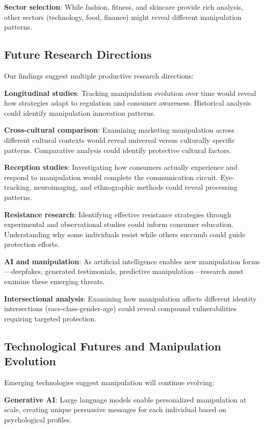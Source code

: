 \textbf{Sector selection}: While fashion, fitness, and skincare provide rich analysis, other sectors (technology, food, finance) might reveal different manipulation patterns.

\subsection{Future Research Directions}

Our findings suggest multiple productive research directions:

\textbf{Longitudinal studies}: Tracking manipulation evolution over time would reveal how strategies adapt to regulation and consumer awareness. Historical analysis could identify manipulation innovation patterns.

\textbf{Cross-cultural comparison}: Examining marketing manipulation across different cultural contexts would reveal universal versus culturally specific patterns. Comparative analysis could identify protective cultural factors.

\textbf{Reception studies}: Investigating how consumers actually experience and respond to manipulation would complete the communication circuit. Eye-tracking, neuroimaging, and ethnographic methods could reveal processing patterns.

\textbf{Resistance research}: Identifying effective resistance strategies through experimental and observational studies could inform consumer education. Understanding why some individuals resist while others succumb could guide protection efforts.

\textbf{AI and manipulation}: As artificial intelligence enables new manipulation forms—deepfakes, generated testimonials, predictive manipulation—research must examine these emerging threats.

\textbf{Intersectional analysis}: Examining how manipulation affects different identity intersections (race-class-gender-age) could reveal compound vulnerabilities requiring targeted protection.

\subsection{Technological Futures and Manipulation Evolution}

Emerging technologies suggest manipulation will continue evolving:

\textbf{Generative AI}: Large language models enable personalized manipulation at scale, creating unique persuasive messages for each individual based on psychological profiles.


